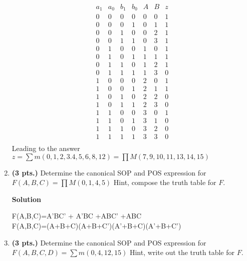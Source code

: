 \begin{enumerate}
\begin{onlysolution}
            $$
            \begin{array}{c|c|c|c||c|c||c}
                a_1 & a_0 & b_1 & b_0 & A  & B & z  \\ \hline
                0 & 0 & 0 & 0 & 0 & 0 & 1  \\ \hline
                0 & 0 & 0 & 1 & 0 & 1 & 1  \\ \hline
                0 & 0 & 1 & 0 & 0 & 2 & 1  \\ \hline
                0 & 0 & 1 & 1 & 0 & 3 & 1  \\ \hline
                0 & 1 & 0 & 0 & 1 & 0 & 1  \\ \hline
                0 & 1 & 0 & 1 & 1 & 1 & 1  \\ \hline
                0 & 1 & 1 & 0 & 1 & 2 & 1  \\ \hline
                0 & 1 & 1 & 1 & 1 & 3 & 0  \\ \hline
                1 & 0 & 0 & 0 & 2 & 0 & 1  \\ \hline
                1 & 0 & 0 & 1 & 2 & 1 & 1  \\ \hline
                1 & 0 & 1 & 0 & 2 & 2 & 0  \\ \hline
                1 & 0 & 1 & 1 & 2 & 3 & 0  \\ \hline
                1 & 1 & 0 & 0 & 3 & 0 & 1  \\ \hline
                1 & 1 & 0 & 1 & 3 & 1 & 0  \\ \hline
                1 & 1 & 1 & 0 & 3 & 2 & 0  \\ \hline
                1 & 1 & 1 & 1 & 3 & 3 & 0  \\
            \end{array}$$
            Leading to the answer
            $ z = \sum m(0,1,2,3.4,5,6,8,12) = \prod M(7,9,10,11,13,14,15)$
        \end{onlysolution}

    \item \textbf{ (3 pts.)} Determine the canonical SOP and POS expression for
        $F(A,B,C) = \prod M (0,1,4,5)$  Hint, compose the truth table for $F$.

        \begin{onlysolution}  \textbf{Solution} \itshape

            F(A,B,C)=A'BC' + A'BC +ABC' +ABC  \\
            F(A,B,C)=(A+B+C)(A+B+C')(A'+B+C)(A'+B+C')
        \end{onlysolution}

    \item \textbf{ (3 pts.)} Determine the canonical SOP and POS expression for
        $F(A,B,C,D) = \sum m(0,4,12,15)$ Hint, write out the truth table for $F$.


\end{enumerate}
